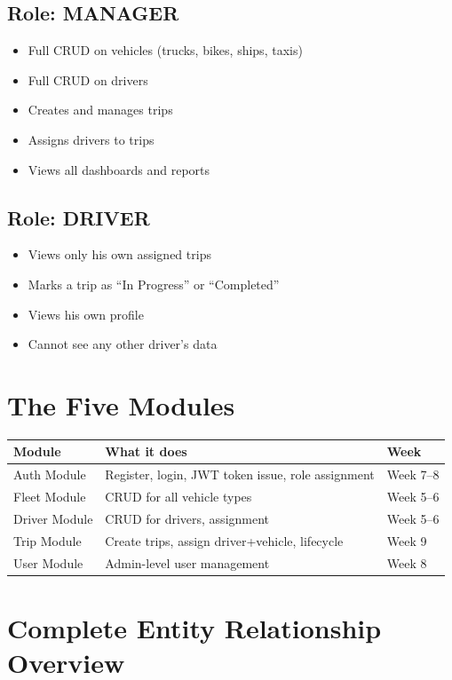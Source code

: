 \documentclass[12pt,a4paper]{report}
\begin{document}
\subsection{Role: MANAGER}
\begin{itemize}
  \item Full CRUD on vehicles (trucks, bikes, ships, taxis)
  \item Full CRUD on drivers
  \item Creates and manages trips
  \item Assigns drivers to trips
  \item Views all dashboards and reports
\end{itemize}

\subsection{Role: DRIVER}
\begin{itemize}
  \item Views only his own assigned trips
  \item Marks a trip as ``In Progress'' or ``Completed''
  \item Views his own profile
  \item Cannot see any other driver's data
\end{itemize}

\section{The Five Modules}

\begin{tabularx}{\textwidth}{@{}lXl@{}}
\toprule
\textbf{Module} & \textbf{What it does} & \textbf{Week} \\
\midrule
Auth Module & Register, login, JWT token issue, role assignment & Week 7--8 \\
Fleet Module & CRUD for all vehicle types & Week 5--6 \\
Driver Module & CRUD for drivers, assignment & Week 5--6 \\
Trip Module & Create trips, assign driver+vehicle, lifecycle & Week 9 \\
User Module & Admin-level user management & Week 8 \\
\bottomrule
\end{tabularx}

\section{Complete Entity Relationship Overview}
\end{document}
